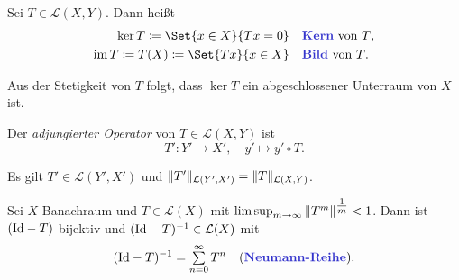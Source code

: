 \documentclass{cheat-sheet}
\newcommand{\K}{\mathbb{K}}
\newcommand{\Leb}{\mathcal{L}} %
\newcommand{\LSO}{\mathcal{L}} %
\begin{document}

\begin{defn}
  Sei $T \in \LSO(X, Y)$. Dann heißt
  \begin{align*}
    \ker T \coloneqq \Set{ x \in X }{ Tx = 0 } \quad &\text{\emph{Kern} von $T$,}\\
    \im T \coloneqq T(X) \coloneqq \Set{ Tx }{ x \in X } \quad &\text{\emph{Bild} von $T$.}
  \end{align*}
\end{defn}

\begin{bem}
  Aus der Stetigkeit von $T$ folgt, dass $\ker T$ ein abgeschlossener Unterraum von $X$ ist.
\end{bem}


\begin{defn}
  Der \emph{adjungierter Operator} von $T \in \LSO(X, Y)$ ist
  \[ T' : Y' \to X', \quad y' \mapsto y' \circ T. \]
\end{defn}

\begin{satz}
  Es gilt $T' \in \Leb(Y', X')$ und $\norm{T'}_{\LSO(Y', X')} = \norm{T}_{\LSO(X, Y)}$.
\end{satz}

\iffalse
  \begin{bsp}
    Seien $p, q \in \left[ 1, \infty \right]$ mit $\tfrac{1}{p} + \tfrac{1}{q} = 1$ und $g \in L^q(S, \K)$. Dann ist ein Funktional $T_g \in (L^p(S, \K))'$ definiert durch
    \[ T_g : L^p(S, \K) \to \K, \quad f \mapsto \Int{S}{}{f \cdot \overline{g}}{\mu}. \]
  \end{bsp}
\fi


\begin{satz}
  Sei $X$ Banachraum und $T \in \LSO(X)$ mit $\limsup_{m \to \infty} \,\lVert T^m\rVert^{\tfrac{1}{m}} < 1$. Dann ist $(\mathrm{Id} - T)$ bijektiv und $(\Id - T)^{-1} \in \LSO(X)$ mit
  \[
    (\Id - T)^{-1} = \sum_{n=0}^\infty T^n
    \quad \text{(\emph{Neumann-Reihe}).}
  \]
\end{satz}
\end{document}
